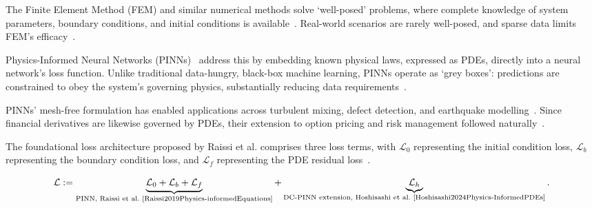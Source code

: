 \documentclass[11pt, a4paper]{article}
\begin{document}
The Finite Element Method (FEM) and similar numerical methods solve `well-posed' problems, where complete knowledge of system parameters, boundary conditions, and initial conditions is available~\cite{Toscano2024FromLearning}. Real-world scenarios are rarely well-posed, and sparse data limits FEM's efficacy~\cite{Toscano2024FromLearning}.

Physics-Informed Neural Networks (PINNs)~\cite{Raissi2019Physics-informedEquations} address this by embedding known physical laws, expressed as PDEs, directly into a neural network's loss function. Unlike traditional data-hungry, black-box machine learning, PINNs operate as `grey boxes': predictions are constrained to obey the system's governing physics, substantially reducing data requirements~\cite{Raissi2019Physics-informedEquations, Toscano2024FromLearning}.

PINNs' mesh-free formulation has enabled applications across turbulent mixing, defect detection, and earthquake modelling~\cite{Toscano2024FromLearning}. Since financial derivatives are likewise governed by PDEs, their extension to option pricing and risk management followed naturally~\cite{Dhiman2023PhysicsPricing, Hainaut2024OptionNetworks}.

The foundational loss architecture proposed by Raissi et al. comprises three loss terms, with $\mathcal{L}_0$ representing the initial condition loss, $\mathcal{L}_b$ representing the boundary condition loss, and $\mathcal{L}_f$ representing the PDE residual loss~\cite{Raissi2019Physics-informedEquations, Hoshisashi2024Whack-a-moleSurface}.

\begin{equation}
    \mathcal{L} := \underbrace{\mathcal{L}_0 + \mathcal{L}_b + \mathcal{L}_f}_{\text{PINN, Raissi et al.~\cite{Raissi2019Physics-informedEquations}}} + \underbrace{\mathcal{L}_h}_{\text{DC-PINN extension, Hoshisashi et al.~\cite{Hoshisashi2024Physics-InformedPDEs}}}.
\end{equation}
\end{document}
